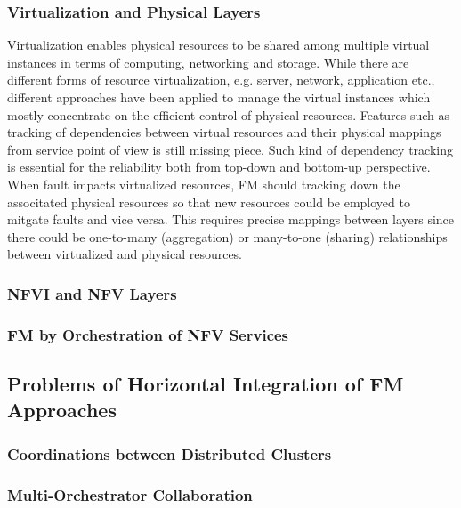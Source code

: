 \subsubsection{Virtualization and Physical Layers}

Virtualization enables physical resources to be shared among multiple virtual
instances in terms of computing, networking and storage. While there are
different forms of resource virtualization, e.g. server, network, application
etc., different approaches have been applied to manage the virtual instances
which mostly concentrate on the efficient control of physical resources.
Features such as tracking of dependencies between virtual resources and their
physical mappings from service point of view is still missing piece.  Such kind
of dependency tracking is essential for the reliability both from top-down and
bottom-up perspective. When fault impacts virtualized resources, FM should
tracking down the associtated physical resources so that new resources could be
employed to mitgate faults and vice versa. This requires precise mappings
between layers since there could be one-to-many (aggregation) or many-to-one
(sharing) relationships between virtualized and physical resources. 
 
\subsubsection{NFVI and NFV Layers}

\subsubsection{FM by Orchestration of NFV Services}

\subsection{Problems of Horizontal Integration of FM Approaches}

\subsubsection{Coordinations between Distributed Clusters}

\subsubsection{Multi-Orchestrator Collaboration}
